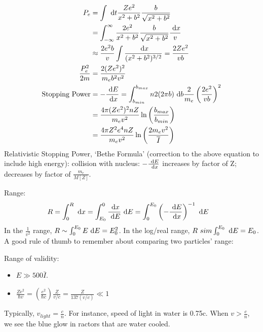 \documentclass{school-22.101-notes}
\date{December 7, 2011}
\begin{document}
\maketitle

\begin{align}
    P_e &= \int \mbox{ }\mathrm{d} t \frac{Ze^2}{x^2 + b^2} \frac{b}{\sqrt{x^2 + b^2}} \\
    &= \int_{-\infty}^{\infty} \frac{2e^2}{x^2+b^2} \frac{b}{\sqrt{x^2 + b^2}} \frac{\mbox{ }\mathrm{d} x}{v} \\
    &\approx \frac{2e^2 b}{v} \int \frac{\mbox{ }\mathrm{d} x}{(x^2 + b^2)^{3/2}} = \frac{2Ze^2}{vb} \\
    \frac{P_e^2}{2m} &= \frac{2 (Ze^2)^2}{m_e b^2 v^2} \\
    \mbox{Stopping Power} &= - \frac{\mbox{ }\mathrm{d} E}{\mbox{ }\mathrm{d} x} = \int_{b_{min}}^{b_{max}} n2(2 \pi b) \mbox{ }\mathrm{d} b \frac{2}{m_e} \left( \frac{2e^2}{vb} \right)^2 \\
    &= \frac{4 \pi (Ze^2)^2nZ }{m_e v^2 } \ln \left( \frac{b_{max}}{b_{min}} \right) \\
    &= \frac{4 \pi Z^2 e^4 n Z}{m_e v^2} \ln \left( \frac{2 m_e v^2}{\left.\overline{I} \right.} \right) 
\end{align}
Relativistic Stopping Power, `Bethe Formula' (correction to the above equation to include high energy):
collision with nucleus: $-\frac{\mbox{ }\mathrm{d} E}{\mbox{ }\mathrm{d} x}$ increases by factor of Z; decreases by factor of $\frac{m_e}{M[Z]}$. 

Range:
\begin{align}
    R &= \int_0^R \mbox{ }\mathrm{d} x = \int_{E_0}^0 \frac{\mbox{ }\mathrm{d} x}{\mbox{ }\mathrm{d} E} \mbox{ }\mathrm{d} E = \int_0^{E_0} \left( - \frac{\mbox{ }\mathrm{d} E}{\mbox{ }\mathrm{d} x} \right)^{-1} \mbox{ }\mathrm{d} E 
\end{align}
In the $\frac{1}{v^2}$ range, $R \sim \int_0^{E_0} E \mbox{ }\mathrm{d} E = E_0^2$. 
In the log/real range, $R\ sim \int_0^{E_0} \mbox{ }\mathrm{d} E  = E_0$. 
A good rule of thumb to remember about comparing two particles' range:

Range of validity:
\begin{itemize}
    \item $E \gg 500 \bar{I}$. 
    \item $\frac{Z e^2}{\hbar v} = \left( \frac{e^2}{\hbar c} \right) \frac{Z}{v/c} = \frac{Z}{137 (v/c) } \ll 1 $
\end{itemize}

Typically, $v_{light} = \frac{c}{n}.$ For instance, speed of light in water is 0.75c. When $v> \frac{c}{n}$, we see the blue glow in ractors that are water cooled. 



\end{document}
